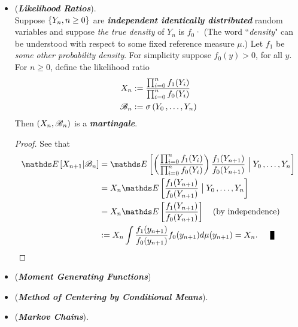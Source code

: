 \documentclass[11pt]{article}
\begin{document}
\begin{itemize}
\item \begin{example} (\emph{\textbf{Likelihood Ratios}}).\\ 
Suppose $\left\{Y_n, n \ge 0\right\}$ are \emph{\textbf{independent identically distributed}} random variables and suppose \emph{the true density} of $Y_n$ is $f_0$· (The word ``\emph{density}" can be understood with respect to some fixed reference measure $\mu$.)  Let $f_1$ be \emph{some other probability density}. For simplicity suppose $f_0(y) > 0$, for all $y$.  For $n \ge 0$, define the likelihood ratio
\begin{align*}
X_n &:= \frac{\prod_{i=0}^{n}f_1(Y_i)}{\prod_{i=0}^{n}f_0(Y_i)}\\
{\mathscr B}_n &:= \sigma\left(Y_0 \,{,}\ldots{,}\, Y_n\right)
\end{align*} Then $(X_n, {\mathscr B}_n)$ is a \emph{\textbf{martingale}}.
\end{example}
\begin{proof}
See that
\begin{align*}
\E{}{X_{n+1} | \srB_n} &= \E{}{ \paren{\frac{\prod_{i=0}^{n}f_1(Y_i)}{\prod_{i=0}^{n}f_0(Y_i)}}\frac{f_1(Y_{n+1})}{f_0(Y_{n+1})} \;  \Big| \; Y_0 \xdotx{,} Y_{n}}\\
&= X_n \E{}{\frac{f_1(Y_{n+1})}{f_0(Y_{n+1})} \;  \big| \; Y_0 \xdotx{,} Y_{n}} \\
&= X_n \E{}{\frac{f_1(Y_{n+1})}{f_0(Y_{n+1})}} \quad (\text{by independence})\\
&:= X_n \int \frac{f_1(y_{n+1})}{f_0(y_{n+1})} f_0(y_{n+1}) d\mu(y_{n+1}) = X_n. \qed
\end{align*}
\end{proof}

\item \begin{example}(\textbf{\emph{Moment Generating Functions}})\\
\end{example}


\item \begin{example}(\textbf{\emph{Method of Centering by Conditional Means}}).\\
\end{example}

\item \begin{example}(\textbf{\emph{Markov Chains}}).\\
\end{example}
\end{itemize}
\end{document}
